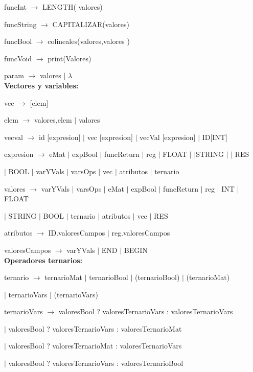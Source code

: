 funcInt $\rightarrow$ LENGTH( valores)

funcString $\rightarrow$ CAPITALIZAR(valores)

funcBool $\rightarrow$ colineales(valores,valores )

funcVoid $\rightarrow$ print(Valores) 

param $\rightarrow$ valores $|$ $\lambda$ \\

\textbf{Vectores y variables:}

vec $\rightarrow$ [elem]

elem $\rightarrow$ valores,elem $|$ valores

vecval $\rightarrow$ id [expresion] $|$ vec [expresion] $|$ vecVal [expresion] $|$ ID[INT]

expresion $\rightarrow$ eMat
$|$  expBool
$|$  funcReturn
$|$  reg
$|$  FLOAT $|$
$|$STRING $|$
$|$  RES

\hspace{15mm}$|$   BOOL $|$  varYVals $|$  varsOps $|$  vec $|$  atributos $|$  ternario 
 
valores $\rightarrow$  varYVals
$|$  varsOps
$|$  eMat
$|$  expBool
$|$  funcReturn
$|$  reg
$|$  INT
$|$  FLOAT
  
  \hspace{15mm}$|$  STRING
  $|$  BOOL
  $|$  ternario
  $|$  atributos
  $|$  vec
  $|$  RES
 
atributos $\rightarrow$ ID.valoresCampos $|$ reg.valoresCampos

valoresCampos $\rightarrow$ varYVals $|$ END $|$ BEGIN \\

\textbf{Operadores ternarios:}

ternario $\rightarrow$ ternarioMat $|$ ternarioBool $|$ (ternarioBool) $|$ (ternarioMat) 

\hspace{15mm}$|$ ternarioVars  $|$ (ternarioVars)

ternarioVars $\rightarrow$ valoresBool ? valoresTernarioVars : valoresTernarioVars  

  \hspace{15mm}$|$  valoresBool ? valoresTernarioVars : valoresTernarioMat 
  
  \hspace{15mm}$|$  valoresBool ? valoresTernarioMat : valoresTernarioVars
  
  \hspace{15mm}$|$  valoresBool ? valoresTernarioVars : valoresTernarioBool 
  
